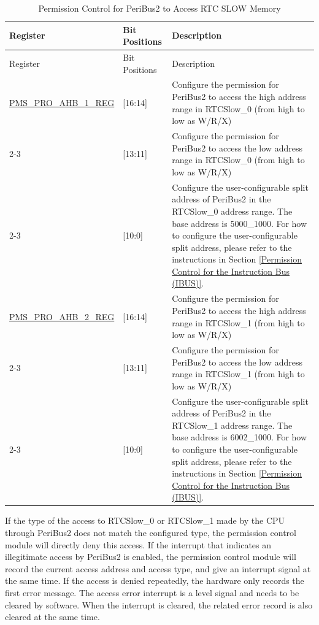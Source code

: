 \documentclass[main\_\_EN.tex]{subfiles}
\begin{document}
\begin{longtable}[h]{|p{4.5cm}|p{2cm}|p{9.5cm}|}
    \caption{Permission Control for PeriBus2 to Access RTC SLOW Memory}
    \label{table:PeriBus2_Permission Control_for_RTCSlow}
    \\\hline
    \rowcolor{lightgray}
    Register & Bit Positions & Description \\
    \hline
    \endfirsthead

    \hline
    \rowcolor{lightgray}
    Register & Bit Positions & Description \\
    \hline
    \endhead

    \endfoot

    \hline
    \endlastfoot

    \hyperref[regdesc:PMSPROAHB1REG]{PMS\_PRO\_AHB\_1\_REG} & [16:14] & Configure the permission for PeriBus2 to access the high address range in RTCSlow\_0 (from high to low as W/R/X)\\
    \cline{2-3}
    & [13:11] & Configure the permission for PeriBus2 to access the low address range in RTCSlow\_0 (from high to low as W/R/X)\\
    \cline{2-3}
    & [10:0] & Configure the user-configurable split address of PeriBus2 in the RTCSlow\_0  address range. The base address is \hexprefix{}5000\_1000. For how to configure the user-configurable split address, please refer to the instructions in Section \ref{Permission Control for the Instruction Bus (IBUS)}. \\
    \hline
    \hyperref[regdesc:PMSPROAHB2REG]{PMS\_PRO\_AHB\_2\_REG} & [16:14] & Configure the permission for PeriBus2 to access the high address range in RTCSlow\_1 (from high to low as W/R/X)\\
    \cline{2-3}
    & [13:11] & Configure the permission for PeriBus2 to access the low address range in RTCSlow\_1 (from high to low as W/R/X)\\
    \cline{2-3}
    & [10:0] & Configure the user-configurable split address of PeriBus2 in the RTCSlow\_1 address range. The base address is \hexprefix{}6002\_1000. For how to configure the user-configurable split address, please refer to the instructions in Section \ref{Permission Control for the Instruction Bus (IBUS)}. \\

\end{longtable}

If the type of the access to RTCSlow\_0 or RTCSlow\_1 made by the CPU through PeriBus2 does not match the configured type, the permission control module will directly deny this access. If the interrupt that indicates an illegitimate access by PeriBus2 is enabled, the permission control module will record the current access address and access type, and give an interrupt signal at the same time. If the access is denied repeatedly, the hardware only records the first error message. The access error interrupt is a level signal and needs to be cleared by software. When the interrupt is cleared, the related error record is also cleared at the same time.
\end{document}
